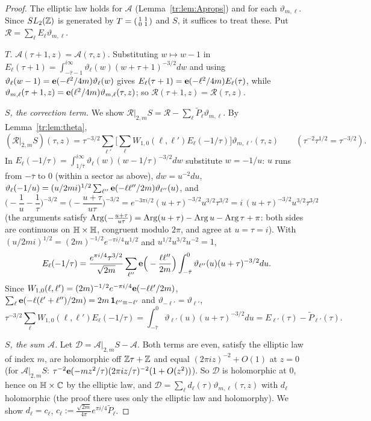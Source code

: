 \begin{proof}
The elliptic law holds for $\mathcal A$ (Lemma~\ref{tr:lem:Aprops}) and for each $\vartheta_{m,\ell}$. Since $SL_2(\mathbb{Z})$ is generated by $T=\begin{psmallmatrix}1&1\\0&1\end{psmallmatrix}$ and $S$, it suffices to treat these. Put $\mathcal R=\sum_\ell E_\ell\vartheta_{m,\ell}$.

\emph{$T$.} $\mathcal A(\tau+1,z)=\mathcal A(\tau,z)$. Substituting $w\mapsto w-1$ in $E_\ell(\tau+1)=\int_{-\bar\tau-1}^{i\infty}\vartheta_\ell(w)(w+\tau+1)^{-3/2}dw$ and using $\vartheta_\ell(w-1)=\mathbf e(-\ell^2/4m)\vartheta_\ell(w)$ gives $E_\ell(\tau+1)=\mathbf e(-\ell^2/4m)E_\ell(\tau)$, while $\vartheta_{m,\ell}(\tau+1,z)=\mathbf e(\ell^2/4m)\vartheta_{m,\ell}(\tau,z)$; so $\mathcal R(\tau+1,z)=\mathcal R(\tau,z)$.

\emph{$S$, the correction term.} We show $\mathcal R|_{2,m}S=\mathcal R-\sum_\ell\tilde P_\ell\vartheta_{m,\ell}$. By Lemma~\ref{tr:lem:theta},
\[
(\mathcal R|_{2,m}S)(\tau,z)=\tau^{-3/2}\sum_{\ell'}\Big[\sum_\ell W_{1,0}(\ell,\ell')E_\ell(-1/\tau)\Big]\vartheta_{m,\ell'}(\tau,z)\qquad(\tau^{-2}\tau^{1/2}=\tau^{-3/2}).
\] In $E_\ell(-1/\tau)=\int_{1/\bar\tau}^{i\infty}\vartheta_\ell(w)(w-1/\tau)^{-3/2}dw$ substitute $w=-1/u$: $u$ runs from $-\bar\tau$ to $0$ (within a sector as above), $dw=u^{-2}du$, $\vartheta_\ell(-1/u)=(u/2mi)^{1/2}\sum_{\ell''}\mathbf e(-\ell\ell''/2m)\vartheta_{\ell''}(u)$, and
\[
\Big(-\frac1u-\frac1\tau\Big)^{-3/2}=\Big(-\frac{u+\tau}{u\tau}\Big)^{-3/2}=e^{-3\pi i/2}(u+\tau)^{-3/2}u^{3/2}\tau^{3/2}=i\,(u+\tau)^{-3/2}u^{3/2}\tau^{3/2}
\]
(the arguments satisfy $\operatorname{Arg}(-\frac{u+\tau}{u\tau})=\operatorname{Arg}(u+\tau)-\operatorname{Arg} u-\operatorname{Arg}\tau+\pi$: both sides are continuous on $\mathbb{H}\times\mathbb{H}$, congruent modulo $2\pi$, and agree at $u=\tau=i$). With $(u/2mi)^{1/2}=(2m)^{-1/2}e^{-\pi i/4}u^{1/2}$ and $u^{1/2}u^{3/2}u^{-2}=1$,
\[
E_\ell(-1/\tau)=\frac{e^{\pi i/4}\tau^{3/2}}{\sqrt{2m}}\sum_{\ell''}\mathbf e\Big(-\frac{\ell\ell''}{2m}\Big)\int_{-\bar\tau}^{0}\vartheta_{\ell''}(u)(u+\tau)^{-3/2}du .
\]
Since $W_{1,0}(\ell,\ell')=(2m)^{-1/2}e^{-\pi i/4}\mathbf e(-\ell\ell'/2m)$, $\sum_\ell\mathbf e(-\ell(\ell'+\ell'')/2m)=2m\,\mathbf 1_{\ell''\equiv-\ell'}$ and $\vartheta_{-\ell'}=\vartheta_{\ell'}$,
\[
\tau^{-3/2}\sum_\ell W_{1,0}(\ell,\ell')E_\ell(-1/\tau)=\int_{-\bar\tau}^0\vartheta_{\ell'}(u)(u+\tau)^{-3/2}du=E_{\ell'}(\tau)-\tilde P_{\ell'}(\tau).
\]

\emph{$S$, the sum $\mathcal A$.} Let $\mathcal D=\mathcal A|_{2,m}S-\mathcal A$. Both terms are even, satisfy the elliptic law of index $m$, are holomorphic off $\mathbb{Z}\tau+\mathbb{Z}$ and equal $(2\pi iz)^{-2}+O(1)$ at $z=0$ (for $\mathcal A|_{2,m}S$: $\tau^{-2}\mathbf e(-mz^2/\tau)(2\pi iz/\tau)^{-2}(1+O(z^2))$). So $\mathcal D$ is holomorphic at $0$, hence on $\mathbb{H}\times\mathbb{C}$ by the elliptic law, and $\mathcal D=\sum_\ell d_\ell(\tau)\vartheta_{m,\ell}(\tau,z)$ with $d_\ell$ holomorphic \cite[Theorem~5.1]{EZ85} (the proof there uses only the elliptic law and holomorphy). We show $d_\ell=c_\ell$, $c_\ell:=\frac{\sqrt{2m}}{4\pi}e^{\pi i/4}\tilde P_\ell$.


\end{proof}
